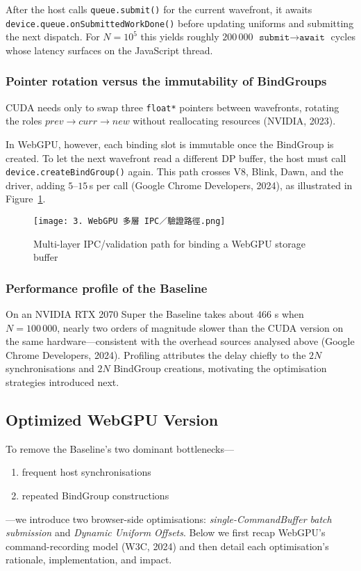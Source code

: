 \documentclass[PhD]{PHlab-thesis}
\begin{document}
After the host calls \texttt{queue.submit()} for the current wavefront, it awaits \texttt{device.queue.onSubmittedWorkDone()} before updating uniforms and submitting the next dispatch. For $N=10^{5}$ this yields roughly $200\,000$ \(\texttt{submit}\!\rightarrow\!\texttt{await}\) cycles whose latency surfaces on the JavaScript thread.

\subsubsection{Pointer rotation versus the immutability of BindGroups}
CUDA needs only to swap three \texttt{float*} pointers between wavefronts, rotating the roles $\textit{prev}\!\rightarrow\!\textit{curr}\!\rightarrow\!\textit{new}$ without reallocating resources (NVIDIA, 2023).

In WebGPU, however, each binding slot is immutable once the BindGroup is created. To let the next wavefront read a different DP buffer, the host must call \texttt{device.createBindGroup()} again. This path crosses V8, Blink, Dawn, and the driver, adding $5$–$15$\,\textmu s per call (Google Chrome Developers, 2024), as illustrated in Figure~\ref{fig:webgpu-ipc-validation}.

\begin{figure}[htbp]
    \centering
    \texttt{[image: 3. WebGPU 多層 IPC／驗證路徑.png]}
    \caption{Multi-layer IPC/validation path for binding a WebGPU storage buffer}
    \label{fig:webgpu-ipc-validation}
\end{figure}

\subsubsection{Performance profile of the Baseline}
On an NVIDIA RTX 2070 Super the Baseline takes about $466$ s when $N=100\,000$, nearly two orders of magnitude slower than the CUDA version on the same hardware—consistent with the overhead sources analysed above (Google Chrome Developers, 2024). Profiling attributes the delay chiefly to the $2N$ synchronisations and $2N$ BindGroup creations, motivating the optimisation strategies introduced next.




\subsection{Optimized WebGPU Version}

To remove the Baseline’s two dominant bottlenecks—
\begin{enumerate}
  \item frequent host synchronisations
  \item repeated BindGroup constructions
\end{enumerate}
—we introduce two browser-side optimisations: \emph{single-CommandBuffer batch submission} and \emph{Dynamic Uniform Offsets}. Below we first recap WebGPU’s command-recording model (W3C, 2024) and then detail each optimisation’s rationale, implementation, and impact.
\end{document}
